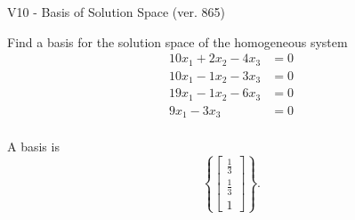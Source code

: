 \begin{exercise}
  \begin{exerciseTitle}V10 - Basis of Solution Space (ver. 865)\end{exerciseTitle}
  \begin{exerciseStatement}
    Find a basis for the solution space of the homogeneous system 
\begin{align*}
 10 x_ 1 + 2 x_ 2 -4 x_ 3 &= 0  \\ 
  10 x_ 1 -1 x_ 2 -3 x_ 3 &= 0  \\ 
  19 x_ 1 -1 x_ 2 -6 x_ 3 &= 0  \\ 
  9 x_ 1 -3 x_ 3 &= 0  \\ 
 \end{align*}


 
  \end{exerciseStatement}

  \begin{exerciseAnswer}
   A basis is   
\[\left\{\left[\begin{array}{c}
\frac{1}{3} \\
\frac{1}{3} \\
1
\end{array}\right]\right\}.\]

  


  \end{exerciseAnswer}
\end{exercise}